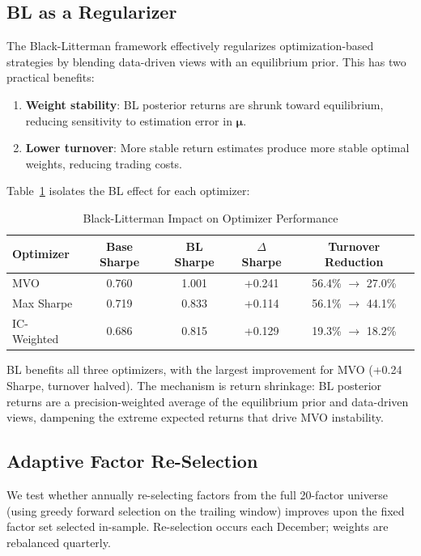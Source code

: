 \documentclass[12pt,a4paper]{article}
\begin{document}
\subsection{BL as a Regularizer}

The Black-Litterman framework effectively regularizes optimization-based strategies by blending data-driven views with an equilibrium prior. This has two practical benefits:
\begin{enumerate}[noitemsep]
    \item \textbf{Weight stability}: BL posterior returns are shrunk toward equilibrium, reducing sensitivity to estimation error in $\boldsymbol{\mu}$.
    \item \textbf{Lower turnover}: More stable return estimates produce more stable optimal weights, reducing trading costs.
\end{enumerate}

Table~\ref{tab:bl_comparison} isolates the BL effect for each optimizer:

\begin{table}[H]
\centering
\caption{Black-Litterman Impact on Optimizer Performance}
\label{tab:bl_comparison}
\begin{tabular}{lcccc}
\toprule
\textbf{Optimizer} & \textbf{Base Sharpe} & \textbf{BL Sharpe} & \textbf{$\Delta$ Sharpe} & \textbf{Turnover Reduction} \\
\midrule
MVO         & 0.760 & 1.001 & +0.241 & 56.4\% $\to$ 27.0\% \\
Max Sharpe  & 0.719 & 0.833 & +0.114 & 56.1\% $\to$ 44.1\% \\
IC-Weighted & 0.686 & 0.815 & +0.129 & 19.3\% $\to$ 18.2\% \\
\bottomrule
\end{tabular}
\end{table}

BL benefits all three optimizers, with the largest improvement for MVO (+0.24 Sharpe, turnover halved). The mechanism is return shrinkage: BL posterior returns are a precision-weighted average of the equilibrium prior and data-driven views, dampening the extreme expected returns that drive MVO instability.

\subsection{Adaptive Factor Re-Selection}

We test whether annually re-selecting factors from the full 20-factor universe (using greedy forward selection on the trailing window) improves upon the fixed factor set selected in-sample. Re-selection occurs each December; weights are rebalanced quarterly.
\end{document}
